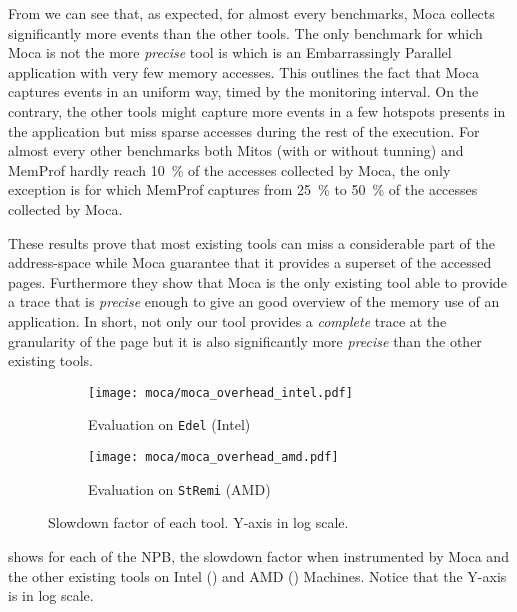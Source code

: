 From  we can see that, as expected, for almost every benchmarks,
\gls{Moca} collects significantly more events than the other tools.  The only
benchmark for which \gls{Moca} is not the more \emph{precise} tool is \EP which is an
Embarrassingly Parallel application with very few memory accesses.
This outlines the fact that \gls{Moca} captures events in an uniform way, timed by the monitoring interval.
On the contrary, the other tools might capture more events in a few hotspots presents in the application but miss
sparse accesses during the rest of the execution.
For almost
every other benchmarks both \gls{Mitos} (with or without tunning) and \gls{MemProf}
hardly reach \SI{10}{\%} of the accesses collected by \gls{Moca}, the only exception is
\DC for which \gls{MemProf} captures from \SI{25}{\%} to \SI{50}{\%} of the accesses
collected by \gls{Moca}.

These results prove that most existing tools can miss a considerable part of
the address-space while \gls{Moca} guarantee that it provides a superset of the accessed
pages. Furthermore they show that \gls{Moca} is the only existing tool able to provide a
trace that is \emph{precise} enough to give an good overview of the memory use of an application. In
short, not only our tool provides a \emph{complete} trace at the granularity of the
page but it is also significantly more \emph{precise} than the other existing tools.

\begin{figure}[htb]
    \centering
    \begin{subfigure}{.49\linewidth}
        \texttt{[image: moca/moca\_overhead\_intel.pdf]}
        \caption{Evaluation on \texttt{Edel} (Intel)}
        \label{fig:ovh-moca-Intel}
    \end{subfigure}
    \begin{subfigure}{.49\linewidth}
        \texttt{[image: moca/moca\_overhead\_amd.pdf]}
        \caption{Evaluation on \texttt{StRemi} (AMD)}
        \label{fig:ovh-moca-AMD}
    \end{subfigure}
    \caption[Slowdown factor of each tool.]{Slowdown factor of each tool.
    Y-axis in log scale.}
    \label{fig:ovh-moca}
\end{figure}

 shows for each of the \gls{NPB}, the slowdown factor when
instrumented by \gls{Moca} and the other existing tools on Intel
() and AMD () Machines. Notice that the Y-axis is in
log scale.

